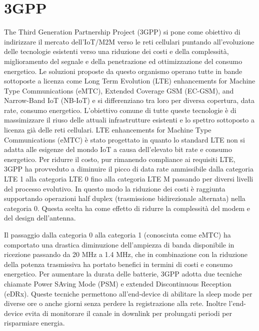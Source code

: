 \documentclass[12pt,a4paper,openright,twoside]{report}
\begin{document}
\section{3GPP}
The Third Generation Partnership Project (3GPP) si pone come obiettivo di indirizzare il mercato dell'IoT/M2M verso le reti cellulari puntando all'evoluzione delle tecnologie esistenti verso una riduzione dei costi e della complessit\`a, miglioramento del segnale e della penetrazione ed ottimizzazione del consumo energetico. 
Le soluzioni proposte da questo organismo operano tutte in bande sottoposte a licenza come Long Term Evolution (LTE) enhancements for Machine Type Communications (eMTC), Extended Coverage GSM (EC-GSM), and Narrow-Band IoT (NB-IoT) e si differenziano tra loro per diversa copertura, data rate, consumo energetico. 
L'obiettivo comune di tutte queste tecnologie \`e di massimizzare il riuso delle attuali infrastrutture esistenti e lo spettro sottoposto a licenza gi\`a delle reti cellulari. 
LTE enhancements for Machine Type Communications (eMTC) \`e stato progettato in quanto lo standard LTE non si adatta alle esigenze del mondo IoT a causa dell'elevato bit rate e consumo energetico. Per ridurre il costo, pur rimanendo compliance ai requisiti LTE, 3GPP ha provveduto a diminuire il picco di data rate ammissibile dalla categoria LTE 1 alla categoria LTE 0 fino alla categoria LTE M passando per diversi livelli del processo evolutivo. In questo modo la riduzione dei costi \`e raggiunta supportando operazioni half duplex (trasmissione bidirezionale alternata) nella categoria 0. Questa scelta ha come effetto di ridurre la complessit\`a del modem e del design dell'antenna.

Il passaggio dalla categoria 0 alla categoria 1 (conosciuta come eMTC) ha comportato una drastica diminuzione dell'ampiezza di banda disponibile in ricezione passando da 20 MHz a 1.4 MHz, che in combinazione con la riduzione della potenza trasmissiva ha portato benefici in termini di costi e consumo energetico. Per aumentare la durata delle batterie, 3GPP adotta due tecniche chiamate Power SAving Mode (PSM) e extended Discontinuous Reception (eDRx). 
Queste tecniche permettono all'end-device di abilitare la sleep mode per diverse ore o anche giorni senza perdere la registrazione alla rete. Inoltre l'end-device evita di monitorare il canale in downlink per prolungati periodi per risparmiare energia. 
\end{document}
